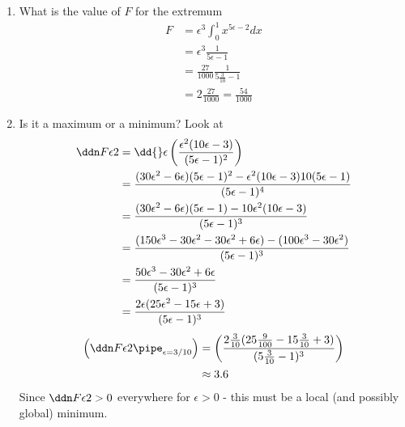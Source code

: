 \documentclass{X:/Documents/Coding/Latex/myassignment}
\begin{document}
\begin{enumerate}
\begin{enumerate}
		\item What is the value of $F$ for the extremum
		\begin{align*}
			F &= \epsilon^3\int_0^1 x^{5 \epsilon -2} dx\\
			&= \epsilon^3 \frac{1}{5 \epsilon -1}\\
			&= \frac{27}{1000} \frac{1}{5 \frac{3}{10} - 1}\\
			&= 2\frac{27}{1000} =\frac{54}{1000}
		\end{align*}
		\item Is it a maximum or a minimum?
		Look at 
		\begin{align*}
		\ddn F \epsilon 2 &= \dd{}\epsilon \left(\frac{\epsilon^2(10 \epsilon - 3)}{(5 \epsilon -1 )^2}\right)\\
		&= \frac{(30 \epsilon^2 -6 \epsilon)(5 \epsilon -1)^2 - \epsilon^2(10 \epsilon - 3)10(5 \epsilon - 1)}{(5 \epsilon -1)^4}\\
		&= \frac{(30 \epsilon^2 -6 \epsilon)(5 \epsilon -1) - 10\epsilon^2(10 \epsilon - 3)}{(5 \epsilon -1)^3}\\
		&= \frac{(150 \epsilon^3 - 30 \epsilon^2 -30 \epsilon^2 + 6 \epsilon) -(100 \epsilon^3 - 30 \epsilon^2)}{(5 \epsilon -1)^3}\\
		&= \frac{50 \epsilon^3 - 30 \epsilon^2 + 6 \epsilon}{(5 \epsilon-1)^3}\\
		&=\frac{2 \epsilon (25 \epsilon^2-15 \epsilon+3)}{(5 \epsilon-1)^3}
		\end{align*}
		\begin{align*}
			\left(\ddn F \epsilon 2\pipe_{\epsilon = 3/10}\right) &= \left(\frac{2 \frac{3}{10} (25 \frac{9}{100}-15 \frac{3}{10} +3)}{(5 \frac{3}{10}-1)^3}\right)\\
			&\approx 3.6
		\end{align*}
		Since $\ddn F \epsilon 2  > 0$ everywhere for $\epsilon > 0$ - this must be a local (and possibly global) minimum.



\end{enumerate}
\end{enumerate}
\end{document}
